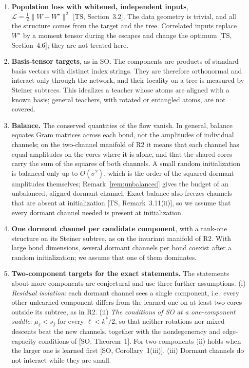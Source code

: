 \documentclass[11pt]{article}
\newcommand{\norm}[1]{\lVert #1\rVert}
\newcommand{\TS}{\textsf{TS}}
\newcommand{\SO}{\textsf{SO}}
\newcommand{\ts}[1]{[\TS, #1]}
\newcommand{\so}[1]{[\SO, #1]}
\theoremstyle{definition}
\numberwithin{equation}{section}
\begin{document}
\begin{enumerate}[label=\textbf{A\arabic*.},leftmargin=*,itemsep=3pt]
\item \textbf{Population loss with whitened, independent inputs}, $\mathcal L=\tfrac12\norm{W-W^\star}^2$ \ts{Section~3.2}. The data geometry is trivial, and all the structure comes from the target and the tree. Correlated inputs replace $W^\star$ by a moment tensor during the escapes and change the optimum \ts{Section~4.6}; they are not treated here.
\item \textbf{Basis-tensor targets}, as in \SO. The components are products of standard basis vectors with distinct index strings. They are therefore orthonormal and interact only through the network, and their locality on a tree is measured by Steiner subtrees. This idealizes a teacher whose atoms are aligned with a known basis; general teachers, with rotated or entangled atoms, are not covered.
\item \textbf{Balance.} The conserved quantities of the flow vanish. In general, balance equates Gram matrices across each bond, not the amplitudes of individual channels; on the two-channel manifold of R2 it means that each channel has equal amplitudes on the cores where it is alone, and that the shared cores carry the sum of the squares of both channels. A small random initialization is balanced only up to $O(\sigma^2)$, which is the order of the squared dormant amplitudes themselves; Remark~\ref{rem:unbalanced} gives the budget of an unbalanced, aligned dormant channel. Exact balance also freezes channels that are absent at initialization \ts{Remark~3.11(ii)}, so we assume that every dormant channel needed is present at initialization.
\item \textbf{One dormant channel per candidate component}, with a rank-one structure on its Steiner subtree, as on the invariant manifold of R2. With large bond dimensions, several dormant channels per bond coexist after a random initialization; we assume that one of them dominates.
\item \textbf{Two-component targets for the exact statements.} The statements about more components are conjectural and use three further assumptions. (i) \emph{Residual isolation}: each dormant channel sees a single component, i.e.\ every other unlearned component differs from the learned one on at least two cores outside its subtree, as in R2. (ii) \emph{The conditions of \SO{} at a one-component saddle}: $\mu_\ell<s_j$ for every $\ell<k^*/2$, so that neither rotations nor mixed descents beat the new channels, together with the nondegeneracy and edge-capacity conditions of \so{Theorem~1}. For two components (ii) holds when the larger one is learned first \so{Corollary~1(iii)}. (iii) Dormant channels do not interact while they are small.

\end{enumerate}
\end{document}

